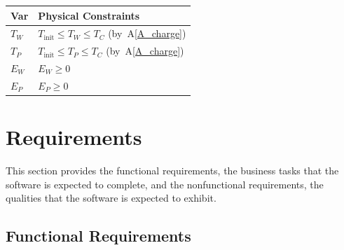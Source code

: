 \documentclass[12pt]{article}
\newcommand{\aref}[1]{A\ref{#1}}
\begin{document}
\begin{table}[!h]
\caption{Output Variables} \label{TblOutputVar}
\renewcommand{\arraystretch}{1.2}
\noindent \begin{longtable*}{l l} 
  \toprule
  \textbf{Var} & \textbf{Physical Constraints} \\
  \midrule 
  $T_W$ & $T_\text{init} \leq T_W \leq T_C$ (by~\aref{A_charge})
  \\
  $T_P$ & $T_\text{init} \leq T_P \leq T_C$ (by~\aref{A_charge})
  \\
  $E_W$ & $E_W \geq 0$
  \\
  $E_P$ & $E_P \geq 0$
  \\
  \bottomrule
\end{longtable*}
\end{table}

\section{Requirements}

This section provides the functional requirements, the business tasks that the
software is expected to complete, and the nonfunctional requirements, the
qualities that the software is expected to exhibit.

\subsection{Functional Requirements}
\end{document}

